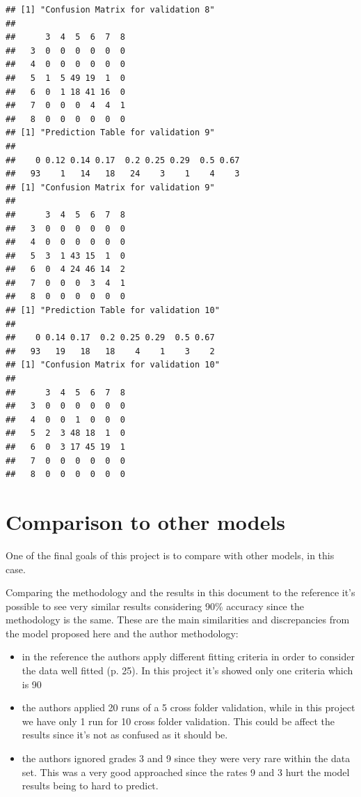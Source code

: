 \documentclass[]{article}
\begin{document}
\begin{verbatim}
## [1] "Confusion Matrix for validation 8"
##    
##      3  4  5  6  7  8
##   3  0  0  0  0  0  0
##   4  0  0  0  0  0  0
##   5  1  5 49 19  1  0
##   6  0  1 18 41 16  0
##   7  0  0  0  4  4  1
##   8  0  0  0  0  0  0
## [1] "Prediction Table for validation 9"
## 
##    0 0.12 0.14 0.17  0.2 0.25 0.29  0.5 0.67 
##   93    1   14   18   24    3    1    4    3 
## [1] "Confusion Matrix for validation 9"
##    
##      3  4  5  6  7  8
##   3  0  0  0  0  0  0
##   4  0  0  0  0  0  0
##   5  3  1 43 15  1  0
##   6  0  4 24 46 14  2
##   7  0  0  0  3  4  1
##   8  0  0  0  0  0  0
## [1] "Prediction Table for validation 10"
## 
##    0 0.14 0.17  0.2 0.25 0.29  0.5 0.67 
##   93   19   18   18    4    1    3    2 
## [1] "Confusion Matrix for validation 10"
##    
##      3  4  5  6  7  8
##   3  0  0  0  0  0  0
##   4  0  0  1  0  0  0
##   5  2  3 48 18  1  0
##   6  0  3 17 45 19  1
##   7  0  0  0  0  0  0
##   8  0  0  0  0  0  0
\end{verbatim}

\section{Comparison to other models}\label{comparison-to-other-models}

One of the final goals of this project is to compare with other models,
in this case.

Comparing the methodology and the results in this document to the
reference it's possible to see very similar results considering 90\%
accuracy since the methodology is the same. These are the main
similarities and discrepancies from the model proposed here and the
author methodology:

\begin{itemize}

\item in the reference the authors apply different fitting criteria in order to consider the data well fitted (p. 25). In this project it's showed only one criteria which is 90%
\item the authors applied 20 runs of a 5 cross folder validation, while in this project we have only 1 run for 10 cross folder validation. This could be affect the results since it's not as confused as it should be.
\item the authors ignored grades 3 and 9 since they were very rare within the data set. This was a very good approached since the rates 9 and 3 hurt the model results being to hard to predict.

 \end{itemize}
\end{document}
